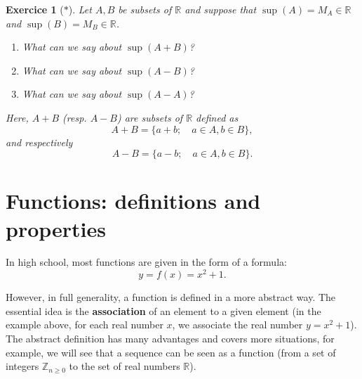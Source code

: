 \documentclass[
	fontsize=10pt, %
	twoside=true, %
	secnumdepth=1, %
	numbers=noenddot, %
]{kaobook}
\newtheorem{exer}{Exercice}[chapter]
\begin{document}
\begin{exer}[$\ast$]
Let $A,B$ be subsets of $\mathbb{R}$ and suppose that $\sup(A)=M_A\in\mathbb{R}$ and $\sup(B)=M_B\in\mathbb{R}$.
\begin{enumerate}
	\item What can we say about $\sup(A+B)$?
	\item What can we say about $\sup(A-B)$?
	\item What can we say about $\sup(A-A)$?
\end{enumerate}
Here, $A+B$ (resp. $A-B$) are subsets of $\mathbb{R}$ defined as
\begin{equation*}
A+B=\{a+b;\quad a\in A, b\in B\},
\end{equation*}
and respectively
\begin{equation*}
A-B=\{a-b;\quad a\in A, b\in B\}.
\end{equation*}
\end{exer}













































\chapter{Functions: definitions and properties}
In high school, most functions are given in the form of a formula:
\begin{equation*}
y=f(x)=x^{2}+1.
\end{equation*}

However, in full generality, a function is defined in a more abstract way. The essential idea is the \textbf{association} of an element to a given element (in the example above, for each real number $x$, we associate the real number $y=x^2+1$). The abstract definition has many advantages and covers more situations, for example, we will see that a sequence can be seen as a function (from a set of integers $\mathbb{Z}_{n\geq 0}$ to the set of real numbers $\mathbb{R}$).
\end{document}
